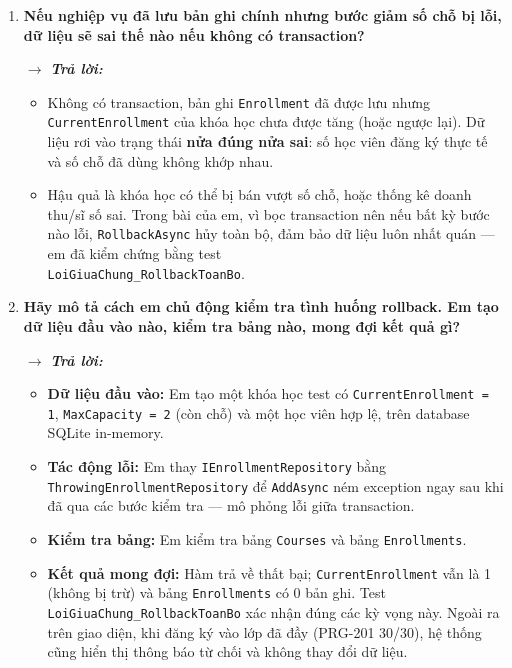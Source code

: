 \begin{enumerate}[label = \arabic*.]
    \item \textbf{Nếu nghiệp vụ đã lưu bản ghi chính nhưng bước giảm số chỗ bị lỗi, dữ liệu sẽ sai thế nào nếu không có transaction?}

    $\rightarrow$ \textbf{\textit{Trả lời:}}
    \begin{itemize}[leftmargin = 0.6cm, label = -]
        \item Không có transaction, bản ghi \texttt{Enrollment} đã được lưu nhưng \texttt{CurrentEnrollment} của khóa học chưa được tăng (hoặc ngược lại). Dữ liệu rơi vào trạng thái \textbf{nửa đúng nửa sai}: số học viên đăng ký thực tế và số chỗ đã dùng không khớp nhau.

        \item Hậu quả là khóa học có thể bị bán vượt số chỗ, hoặc thống kê doanh thu/sĩ số sai. Trong bài của em, vì bọc transaction nên nếu bất kỳ bước nào lỗi, \texttt{RollbackAsync} hủy toàn bộ, đảm bảo dữ liệu luôn nhất quán --- em đã kiểm chứng bằng test \\ \texttt{LoiGiuaChung\_RollbackToanBo}.
    \end{itemize}

    \item \textbf{Hãy mô tả cách em chủ động kiểm tra tình huống rollback. Em tạo dữ liệu đầu vào nào, kiểm tra bảng nào, mong đợi kết quả gì?}

    $\rightarrow$ \textbf{\textit{Trả lời:}}
    \begin{itemize}[leftmargin = 0.6cm, label = -]
        \item \textbf{Dữ liệu đầu vào:} Em tạo một khóa học test có \texttt{CurrentEnrollment = 1}, \texttt{MaxCapacity = 2} (còn chỗ) và một học viên hợp lệ, trên database SQLite in-memory.

        \item \textbf{Tác động lỗi:} Em thay \texttt{IEnrollmentRepository} bằng \\ \texttt{ThrowingEnrollmentRepository} để \texttt{AddAsync} ném exception ngay sau khi đã qua các bước kiểm tra --- mô phỏng lỗi giữa transaction.

        \item \textbf{Kiểm tra bảng:} Em kiểm tra bảng \texttt{Courses} và bảng \texttt{Enrollments}.

        \item \textbf{Kết quả mong đợi:} Hàm trả về thất bại; \texttt{CurrentEnrollment} vẫn là 1 (không bị trừ) và bảng \texttt{Enrollments} có 0 bản ghi. Test \texttt{LoiGiuaChung\_RollbackToanBo} xác nhận đúng các kỳ vọng này. Ngoài ra trên giao diện, khi đăng ký vào lớp đã đầy (PRG-201 30/30), hệ thống cũng hiển thị thông báo từ chối và không thay đổi dữ liệu.
    \end{itemize}


\end{enumerate}
